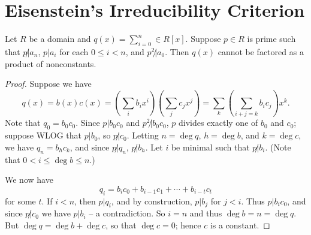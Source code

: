 \documentclass{article}
\begin{document}
\section{Eisenstein's Irreducibility Criterion}

\begin{prop}
Let $R$ be a domain and $q(x) = \sum_{i=0}^n \in R[x]$. Suppose $p \in R$ is prime such that $p \not| a_n$, $p|a_i$ for each $0 \leq i < n$, and $p^2 \not| a_0$. Then $q(x)$ cannot be factored as a product of nonconstants. 
\end{prop}

\begin{proof}
Suppose we have \[ q(x) = b(x)c(x) = \left(\sum_{i}b_ix^i\right)\left(\sum_{j}c_jx^j\right) = \sum_{k}\left( \sum_{i+j = k}b_ic_j \right)x^k. \] Note that $q_0 = b_0c_0$. Since $p | b_0c_0$ and $p^2 \not| b_0c_0$, $p$ divides exactly one of $b_0$ and $c_0$; suppose WLOG that $p|b_0$, so $p \not| c_0$. Letting $n = \deg{q}$, $h = \deg{b}$, and $k = \deg{c}$, we have $q_n = b_hc_k$, and since $p \not| q_n$, $p \not| b_h$. Let $i$ be minimal such that $p\not|b_i$. (Note that $0 < i \leq \deg{b} \leq n$.)

We now have \[ q_i = b_ic_0 + b_{i-1}c_1 + \cdots + b_{i-t}c_t \] for some $t$. If $i < n$, then $p|q_i$, and by construction, $p|b_j$ for $j < i$. Thus $p|b_ic_0$, and since $p \not| c_0$ we have $p|b_i$ -- a contradiction. So $i = n$ and thus $\deg{b} = n = \deg{q}$. But $\deg{q} = \deg{b} + \deg{c}$, so that $\deg{c} = 0$; hence $c$ is a constant.
\end{proof}
\end{document}
